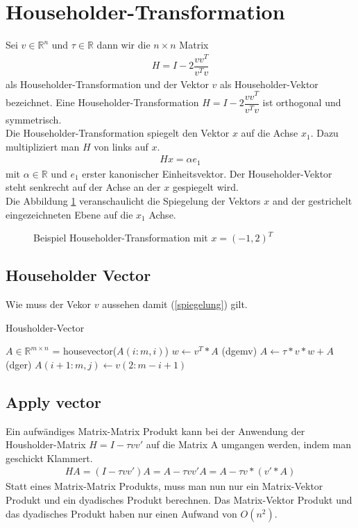 \section{Householder-Transformation}
Sei $v \in \mathbb{R}^n$ und $\tau \in \mathbb{R}$ dann wir die $n \times n$ Matrix 
\begin{align}
	H = I - 2 \dfrac{vv^T}{v^Tv}
\end{align}
als Householder-Transformation und der Vektor $v$ als Householder-Vektor bezeichnet.
Eine Householder-Transformation $H = I - 2 \dfrac{vv^T}{v^Tv}$ ist orthogonal und symmetrisch. \cite{num1}\\
Die Householder-Transformation spiegelt den Vektor $x$ auf die Achse $x_1$.
Dazu multipliziert man $H$ von links auf $x$.
\begin{align}
	Hx=\alpha e_1 \label{spiegelung}
\end{align}
mit $\alpha \in \mathbb{R}$ und $e_1$ erster kanonischer Einheitsvektor. Der Householder-Vektor steht senkrecht auf der Achse an der $x$ gespiegelt wird.\\
Die Abbildung \ref{fig:HHolder} veranschaulicht die Spiegelung der Vektors $x$ and der gestrichelt eingezeichneten Ebene auf die $x_1$ Achse.
\begin{figure}[h]
	\centering
	
	\caption{Beispiel Householder-Transformation mit $x=(-1,2)^T$}
	\label{fig:HHolder}
\end{figure}


\subsection{Householder Vector}
Wie muss der Vekor $v$ aussehen damit (\ref{spiegelung}) gilt.
\begin{algorithm}
	\caption{Housholder-Vector}
	\begin{algorithmic}
		\State $A \in \mathbb{R}^{m \times n}$
		\State [$v$, $\tau$] = housevector($A(i:m,i)$)
		\State $w \leftarrow v^T*A$ (dgemv)
		\State $ A \leftarrow \tau * v * w + A $ (dger)
		\State $A(i + 1 : m, j) \leftarrow v(2 : m - i + 1)$
		\EndIf
		\EndFor	
	\end{algorithmic} 
	\label{alg:unblockedqr}
\end{algorithm}
\subsection{Apply vector}
Ein aufwändiges Matrix-Matrix Produkt kann bei der Anwendung der Housholder-Matrix $H = I - \tau vv'$ auf die Matrix A umgangen werden, indem man geschickt Klammert.
\begin{align*} 
H A =(I - \tau vv') A= A - \tau vv' A = A - \tau v*(v'*A)
\end{align*}
Statt eines Matrix-Matrix Produkts, muss man nun nur ein Matrix-Vektor Produkt und ein dyadisches Produkt berechnen.
Das Matrix-Vektor Produkt und das dyadisches Produkt haben nur einen Aufwand von $O(n^2)$.




